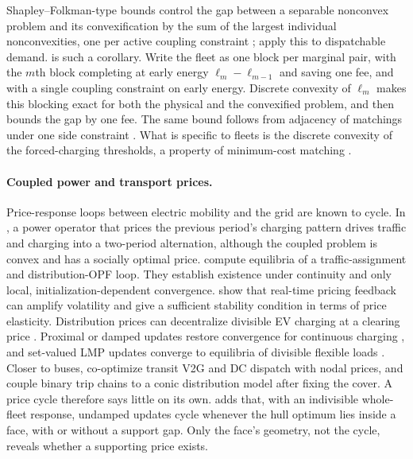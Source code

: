 Shapley--Folkman-type bounds control the gap between a separable
nonconvex problem and its convexification by the sum of the largest
individual nonconvexities, one per active coupling constraint
\citep{starr1969,aubinEkeland1976,bertsekas1983scheduling,udellBoyd2016gap};
\citet{hreinsson2021} apply this to dispatchable demand.
 is such a corollary. Write the fleet as one block per
marginal pair, with the $m$th block completing at early energy
$\ell_m-\ell_{m-1}$ and saving one fee, and with a single coupling
constraint on early energy. Discrete convexity of $\ell_m$ makes this
blocking exact for both the physical and the convexified problem, and
\citet[Thm.~1]{udellBoyd2016gap} then bounds the gap by one fee. The
same bound follows from adjacency of matchings under one side constraint
\citep{raviGoemans1996cmst,berger2011budgeted}. What is specific to fleets
is the discrete convexity of the forced-charging thresholds, a property of
minimum-cost matching \citep{murota2003dca}.

\paragraph{Coupled power and transport prices.}
Price-response loops between electric mobility and the grid are known to
cycle. In \citet[Sec.~V-A and Table~II]{alizadeh2017coupled}, a power
operator that prices the previous period's charging pattern drives traffic
and charging into a two-period alternation, although the coupled problem is
convex and has a socially optimal price. \citet{wei2018equilibrium} compute
equilibria of a traffic-assignment and distribution-OPF loop. They establish
existence under continuity and only local, initialization-dependent
convergence. \citet{roozbehani2012volatility} show that
real-time pricing feedback can amplify volatility and give a sufficient
stability condition in terms of price elasticity.
Distribution prices can decentralize divisible EV charging at a
clearing price \citep{liWuOren2014dlmp}. Proximal or damped updates restore
convergence for continuous charging
\citep{ganTopcuLow2013,ma2016decentralized}, and set-valued LMP updates
converge to equilibria of divisible flexible loads \citep{gong2019lmp}.
Closer to buses, \citet{yetkin2024cooptimizing} co-optimize transit V2G and
DC dispatch with nodal prices, and \citet{najafi2025joint} couple binary
trip chains to a conic distribution model after fixing the cover.
A price cycle therefore says little on its own.  adds
that, with an indivisible whole-fleet response, undamped updates cycle
whenever the hull optimum lies inside a face, with or without a support gap. Only the face's
geometry, not the cycle, reveals whether a supporting price exists.

